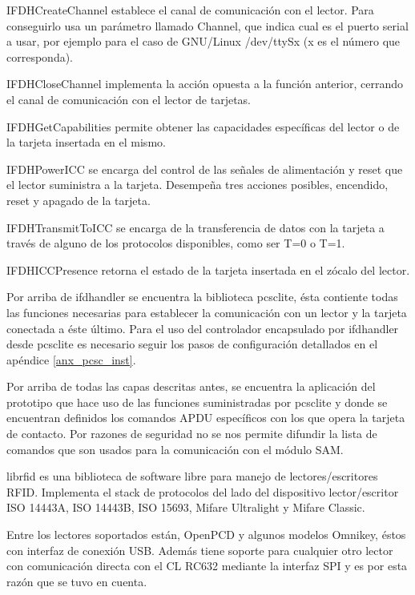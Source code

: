 \bigskip
IFDHCreateChannel establece el canal de comunicación con el lector. Para conseguirlo usa un parámetro llamado Channel, que indica cual es el puerto serial a usar, por ejemplo para el caso de GNU/Linux /dev/ttySx (x es el número que corresponda).

IFDHCloseChannel implementa la acción opuesta a la función anterior, cerrando el canal de comunicación con el lector de tarjetas.

IFDHGetCapabilities permite obtener las capacidades específicas del lector o de la tarjeta insertada en el mismo.

IFDHPowerICC se encarga del control de las señales de alimentación y reset que el lector suministra a la tarjeta. Desempeña tres acciones posibles, encendido, reset y apagado de la tarjeta.

IFDHTransmitToICC se encarga de la transferencia de datos con la tarjeta a través de alguno de los protocolos disponibles, como ser T=0 o T=1.

IFDHICCPresence retorna el estado de la tarjeta insertada en el zócalo del lector.

\bigskip
{}
Por arriba de ifdhandler se encuentra la biblioteca pcsclite, ésta contiente todas las funciones necesarias para establecer la comunicación con un lector y la tarjeta conectada a éste último. Para el uso del controlador encapsulado por ifdhandler desde pcsclite es necesario seguir los pasos de configuración detallados en el apéndice \ref{anx_pcsc_inst}.

\bigskip
{}
Por arriba de todas las capas descritas antes, se encuentra la aplicación del prototipo que hace uso de las funciones suministradas por pcsclite y donde se encuentran definidos los comandos APDU específicos con los que opera la tarjeta de contacto. Por razones de seguridad no se nos permite difundir la lista de comandos que son usados para la comunicación con el módulo SAM.


\bigskip
{}
librfid es una biblioteca de software libre para manejo de lectores/escritores RFID. Implementa el stack de protocolos del lado del dispositivo lector/escritor ISO 14443A, ISO 14443B, ISO 15693, Mifare Ultralight y Mifare Classic.

Entre los lectores soportados están, OpenPCD y algunos modelos Omnikey, éstos con interfaz de conexión USB. Además tiene soporte para cualquier otro lector con comunicación directa con el CL RC632 mediante la interfaz SPI y es por esta razón que se tuvo en cuenta.

